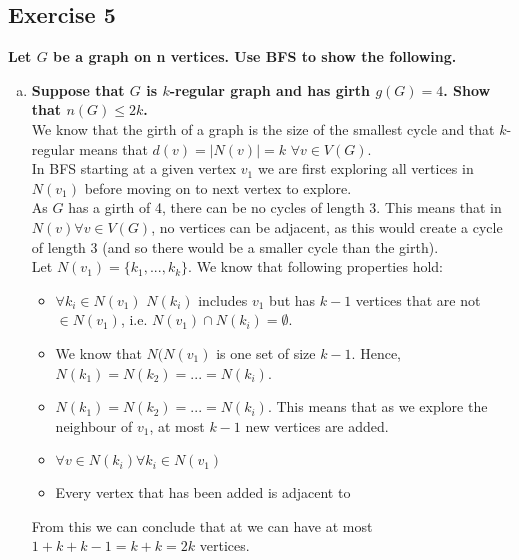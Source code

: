 \subsection*{Exercise 5}
\boldmath
\textbf{Let $G$ be a graph on n vertices. Use BFS to show the following.}
\begin{enumerate}[a)]
    \item \textbf{Suppose that $G$ is $k$-regular graph and has girth $g(G) = 4$. Show that $n(G) \leq 2k$.} \\
    \linebreak 
    \unboldmath
    We know that the girth of a graph is the size of the smallest cycle and that $k$-regular means that $d(v) = |N(v)| = k$ $\forall v \in V(G)$. \\
    \linebreak 
    In BFS starting at a given vertex $v_1$ we are first exploring all vertices in $N(v_1)$ before moving on to next vertex to explore. \\
    \linebreak 
    As $G$ has a girth of 4, there can be no cycles of length 3. This means that in $N(v) \forall v \in V(G)$, no vertices can be adjacent, as this would create a cycle of length 3 (and so there would be a smaller cycle than the girth). \\
    \linebreak 
    Let $N(v_1) = \{k_1, ..., k_k\}$. We know that following properties hold:
    \begin{itemize}
        \item $\forall k_i \in N(v_1)$ $ N(k_i)$ includes $v_1$ but has $k-1$ vertices that are not $\in N(v_1)$, i.e. $N(v_1) \cap N(k_i) = \emptyset$. %
        \item We know that $N(N(v_1)$ is one set of size $k-1$. Hence, $N(k_1) = N(k_2) = ... = N(k_i)$.
        \item $N(k_1) = N(k_2) = ... = N(k_i)$. This means that as we explore the neighbour of $v_1$, at most $k-1$ new vertices are added.
        \item $\forall v \in N(k_i) \forall k_i \in N(v_1)$
        \item Every vertex that has been added is adjacent to 
    \end{itemize}
    From this we can conclude that at we can have at most $1 + k + k-1 = k + k = 2k$ vertices. 

\end{enumerate}
